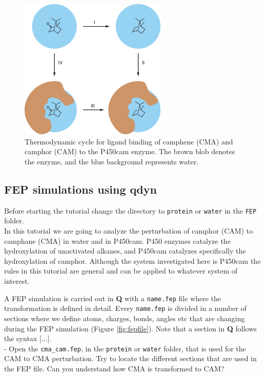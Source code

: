 \documentclass[10pt,oneside,pdftex]{article}
\begin{document}
\begin{figure}
\centering
\includegraphics[width=7cm]{images/lie.eps}
\caption{\label{fig:fep}  Thermodynamic cycle  for  ligand binding  of
  camphene (CMA)  and camphor (CAM)  to the P450cam enzyme.  The brown
  blob denotes the enzyme, and the blue background represents water.}
\end{figure}
\newpage

\subsection{FEP simulations using \textbf{qdyn}}

Before starting the tutorial change the directory to \texttt{protein}
or \texttt{water} in the \texttt{FEP} folder.\\

In this tutorial  we are going to analyze the  perturbation of camphor
(CAM)  to  camphane (CMA)  in  water  and  in P450cam.   P450  enzymes
catalyze  the  hydroxylation  of   unactivated  alkanes,  and  P450cam
catalyzes  specifically the  hydroxylation of  camphor.  Although  the
system investigated  here is  P450cam the rules  in this  tutorial are
general and can be applied to whatever system of interest.

A FEP simulation is carried out in \textbf{Q} with a \texttt{name.fep}
file   where  the   transformation  is   defined  in   detail.   Every
\texttt{name.fep} is divided  in a number of sections  where we define
atoms, charges,  bonds, angles  etc that are  changing during  the FEP
simulation  (Figure   \ref{fig:fepfile}).  Note  that  a   section  in
\textbf{Q} follows the syntax $[$...$]$.\\

-  Open   the  \texttt{cma\_cam.fep},   in  the   \texttt{protein}  or
\texttt{water}   folder,   that  is   used   for   the  CAM   to   CMA
perturbation. Try  to locate the  different sections that are  used in
the FEP file. Can you understand how CMA is transformed to CAM?\\
\end{document}
